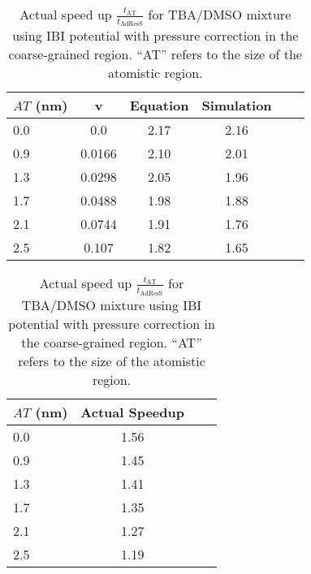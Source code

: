 \documentclass[a4paper,preprint,unsortedaddress]{revtex4-1}
\begin{document}
\begin{table}[htb]
\centering
\begin{minipage}{0.48\textwidth}
\sffamily
\begin{tabular}{l*{5}{c}}
\hline \hline
 \bfseries $AT$ (nm) & \bfseries v & \bfseries Equation & \bfseries Simulation \\
\midrule
\hline \hline
0.0 & 0.0 & 2.17 & 2.16\\
0.9 & 0.0166 & 2.10 & 2.01\\
1.3 & 0.0298 & 2.05 & 1.96 \\
1.7 & 0.0488 & 1.98 & 1.88\\
2.1 & 0.0744 & 1.91 & 1.76\\ 
2.5 & 0.107 & 1.82 & 1.65 \\ \bottomrule
\hline \hline
\end{tabular} 
\caption{Comparison of speed up for TBA/DMSO mixture using IBI potential with pressure correction in the coarse-grained region, calculated using Eq. 9 and from AdResS simulation.}
\label{mixture}
\end{minipage}%
\hfill
\begin{minipage}{0.48\textwidth}
\centering
\sffamily
\begin{tabular}{l*{3}{c}}
\toprule
\hline \hline
 \bfseries $AT$ (nm) & \bfseries Actual Speedup \\
\midrule
\hline \hline
0.0 & 1.56 \\
0.9 & 1.45  \\
1.3 & 1.41 \\
1.7 & 1.35 \\
2.1 & 1.27 \\
2.5 & 1.19 \\ \bottomrule
\hline \hline
\end{tabular}
\caption{{Actual speed up $\frac{t_\text{AT}}{t_\text{AdResS}}$ for TBA/DMSO mixture using IBI potential with pressure correction in the coarse-grained region. ``AT'' refers to the size of the atomistic region.}}
\label{mixture1}
\end{minipage}
\end{table}
\end{document}

